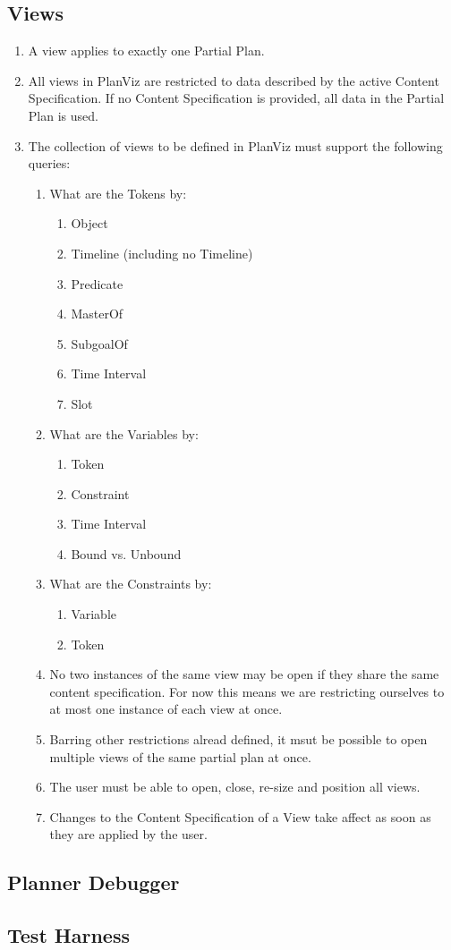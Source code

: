 \documentclass[twoside, 11pt]{article}
\begin{document}
\subsection{Views}
\begin{enumerate}
\item A view applies to exactly one Partial Plan.
\item All views in PlanViz are restricted to data described by the active Content Specification. If no Content Specification is provided, all data in the Partial Plan is used.
\item The collection of views to be defined in PlanViz must support the following queries:
\begin{enumerate}
\item What are the Tokens by:
\begin{enumerate}
\item Object
\item Timeline (including no Timeline)
\item Predicate
\item MasterOf
\item SubgoalOf
\item Time Interval
\item Slot
\end{enumerate}
\item What are the Variables by:
\begin{enumerate}
\item Token
\item Constraint
\item Time Interval
\item Bound vs. Unbound
\end{enumerate}
\item What are the Constraints by:
\begin{enumerate}
\item Variable
\item Token
\end{enumerate}
\item No two instances of the same view may be open if they share the same content specification. For now this means we are restricting ourselves to at most one instance of each view at once.
\item Barring other restrictions alread defined, it msut be possible to open multiple views of the same partial plan at once.
\item The user must be able to open, close, re-size and position all views.
\item Changes to the Content Specification of a View take affect as soon as they are applied by the user.
\end{enumerate}
\end{enumerate}
\subsection{Planner Debugger}
\subsection{Test Harness}
\end{document}

